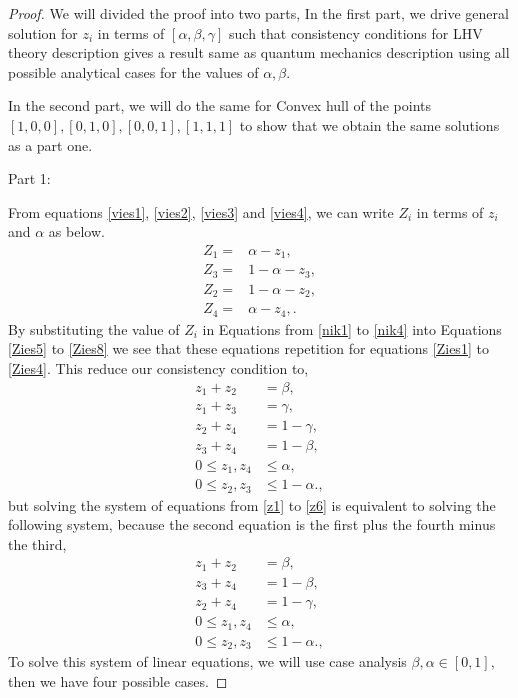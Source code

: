 \begin{proof}
We will divided the proof into two parts, In the first part, we drive general solution for $z_i$ in terms of $[\alpha, \beta, \gamma]$ such that consistency conditions for LHV theory description gives a result same as quantum mechanics description using all possible analytical cases for the values of $\alpha,\beta $.


In the second part, we will do the same for Convex hull of the points $[1, 0, 0], [0, 1, 0], [0, 0, 1], [1, 1, 1]$  to show that we obtain the same solutions as a part one.

Part 1:

From equations \ref{vies1}, \ref{vies2}, \ref{vies3} and \ref{vies4}, we can write $Z_i$ in terms of $z_i$ and $\alpha$ as below.
\begin{align}
Z_1=&\alpha-z_1,\label{nik1}\\
Z_3=&1-\alpha-z_3,\label{nik3}\\
Z_2=&1-\alpha-z_2,\label{nik4}\\
Z_4=&\alpha-z_4,\label{nik2}.
\end{align}
By substituting the value of $Z_i$ in Equations from \ref{nik1} to \ref{nik4} into Equations \ref{Zies5} to \ref{Zies8} we see that these equations repetition for equations \ref{Zies1} to \ref{Zies4}. This reduce our consistency condition to,
\begin{align}
z_1+z_2&=\beta,\label{z1}\\
z_1+z_3&=\gamma,\label{z2}\\
z_2+z_4&=1-\gamma,\label{z4}\\
z_3+z_4&=1-\beta,\label{z3}\\
0\leq z_1,z_4& \leq \alpha,\label{z5}\\
0\leq z_2,z_3 &\leq 1- \alpha.\label{z6},
\end{align}
but solving the system of equations from \ref{z1} to \ref{z6} is equivalent to solving the following system, because the second equation is the first plus the fourth minus the third,
\begin{align}
z_1+z_2&=\beta,\label{z1}\\
z_3+z_4&=1-\beta,\label{z32}\\
z_2+z_4&=1-\gamma,\label{z42}\\
0\leq z_1,z_4& \leq \alpha,\label{z52}\\
0\leq z_2,z_3 &\leq 1- \alpha.\label{z62},
\end{align}
To solve this system of linear equations, we will use case analysis  $\beta, \alpha  \in [0,1]$, then we have four  possible cases.


\end{proof}
